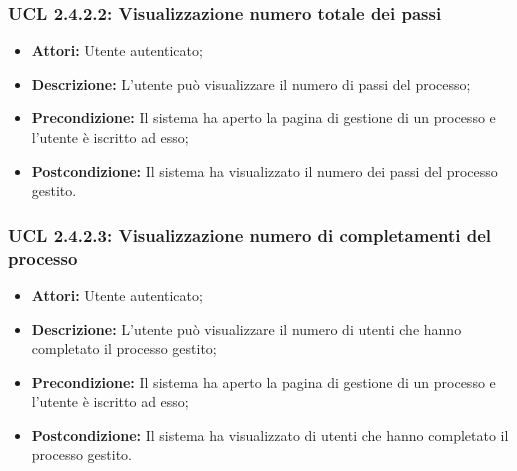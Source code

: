 \hypertarget{L2.4.2.2}{}
\subsubsection{UCL 2.4.2.2: Visualizzazione numero totale dei passi}
\begin{itemize}
\item \textbf{Attori:} Utente autenticato;
\item \textbf{Descrizione:} L'utente può visualizzare il numero di passi del processo;
\item \textbf{Precondizione:} Il sistema ha aperto la pagina di gestione di un processo e l'utente è iscritto ad esso;
\item \textbf{Postcondizione:} Il sistema ha visualizzato il numero dei passi del processo gestito.
\end{itemize}

\hypertarget{L2.4.2.3}{}
\subsubsection{UCL 2.4.2.3: Visualizzazione numero di completamenti del processo}
\begin{itemize}
\item \textbf{Attori:} Utente autenticato;
\item \textbf{Descrizione:} L'utente può visualizzare il numero di utenti che hanno completato il processo gestito;
\item \textbf{Precondizione:} Il sistema ha aperto la pagina di gestione di un processo e l'utente è iscritto ad esso;
\item \textbf{Postcondizione:} Il sistema ha visualizzato di utenti che hanno completato il processo gestito.
\end{itemize}

\hypertarget{L2.4.2.4}{}
